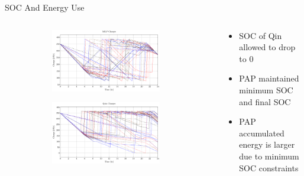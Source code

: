 \documentclass[aspectratio=169]{beamer}
\begin{document}
\begin{frame}[label={sec:orgc40f143}]{SOC And Energy Use}
\begin{columns}
\begin{column}{0.5\columnwidth}
\begin{figure}
\begin{subfigure}[t]{\textwidth}
\centering
    \includegraphics[width=0.95\textwidth]{img/milp-pap/charge-milp}
\end{subfigure}
\begin{subfigure}[t]{\textwidth}
\centering
    \includegraphics[width=0.95\textwidth]{img/milp-pap/charge-qin}
\end{subfigure}
\end{figure}
\end{column}

\begin{column}{0.5\columnwidth}
\begin{itemize}
\item SOC of Qin allowed to drop to 0
\item PAP maintained minimum SOC and final SOC
\item PAP accumulated energy is larger due to minimum SOC constraints
\end{itemize}


\end{column}
\end{columns}
\end{frame}
\end{document}
